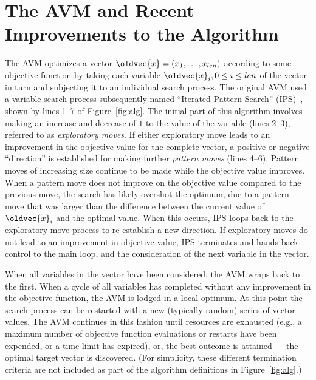 \documentclass{llncs}
\let\vec\oldvec %
\newcommand{\inlineheading}[1]{\vspace{1mm} \noindent {\bf #1.}}
\begin{document}
\section{The AVM and Recent Improvements to the Algorithm}
\vspace{-1em}
\inlineheading{The original AVM} The AVM optimizes a vector $\vec{x} = (x_1, \dots, x_{len})$ according to some objective function by taking each variable $\vec{x}_i, 0 \leq i \leq len$ of the vector in turn and subjecting it to an individual search process. The original AVM used a variable search process subsequently named
``Iterated Pattern Search'' (IPS)~\cite{Kempka2015}, shown by lines 1--7 of Figure~\ref{fig:alg}. The initial part of this algorithm involves making an increase and decrease of $1$ to the value of the variable (lines 2--3), referred to as {\it exploratory moves}. If either exploratory move leads to an improvement in the objective value for the complete vector, a positive or negative ``direction'' is established for making further {\it pattern moves} (lines 4--6). Pattern moves of increasing size continue to be made while the objective value improves. When a pattern move does not improve on the objective value compared to the previous move, the search has likely overshot the optimum, due to a pattern move that was larger than the difference between the current value of $\vec{x}_i$ and the optimal value. When this occurs, IPS loops back to the exploratory move process to re-establish a new direction. If exploratory moves do not lead to an improvement in objective value, IPS terminates and hands back control to the main loop, and the consideration of the next variable in the vector.

When all variables in the vector have been considered, the AVM wraps back to the first. When a cycle of all variables has completed without any improvement in the objective function, the AVM is lodged in a local optimum. At this point the search process can be restarted with a new (typically random) series of vector values.
The AVM continues in this fashion until resources are exhausted (e.g., a maximum number of objective function evaluations or restarts have been expended, or a time limit has expired), or, the best outcome is attained --- the optimal target vector is discovered. (For simplicity, these different termination criteria are not included as part of the algorithm definitions in Figure~\ref{fig:alg}.)
\end{document}
